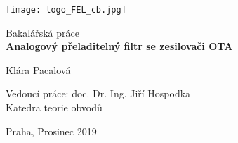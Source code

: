 \begin{titlepage}
    \begin{center}
    
        \texttt{[image: logo\_FEL\_cb.jpg]}
            
        \vspace*{3cm}
 	
        \Large Bakalářská práce \\
        \vspace*{1.5cm}
        \Huge
        \textbf{Analogový přeladitelný filtr se zesilovači OTA}
 
        \vspace{1cm}

        \Large{Klára Pacalová}
 
        \vfill
 
        \vspace{0.8cm}
 		
        \Large
 		Vedoucí práce: doc. Dr. Ing. Jiří Hospodka\\
    		\large Katedra teorie obvodů\\
		
		\vspace{1.5cm}
		        
		\large Praha, Prosinec 2019
 
    \end{center}
\end{titlepage}